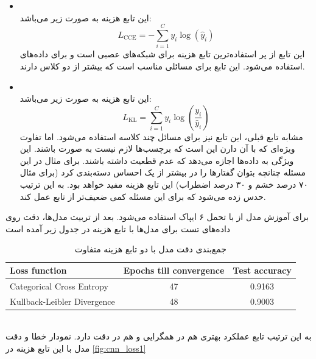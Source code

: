 \documentclass[11pt]{article}
\begin{document}
	\begin{itemize}
		\item \textbf{}\\
		این تابع هزینه به صورت زیر می‌باشد:
		\begin{equation}
			L_{\text{CCE}} = -\sum_{i=1}^{C} y_i \log(\hat{y}_i)
		\end{equation}
		این تابع از پر استفاده‌ترین تابع هزینه برای شبکه‌های عصبی است و برای داده‌های  استفاده می‌شود. این تابع برای مسائلی مناسب است که بیشتر از دو کلاس دارند. 
		\item \textbf{}\\
		این تابع هزینه به صورت زیر می‌باشد:
		\begin{equation}
			L_{\text{KL}} = \sum_{i=1}^{C} y_i \log\left(\frac{y_i}{\hat{y}_i}\right)
		\end{equation}
		مشابه تابع قبلی،‌ این تابع نیز برای مسائل چند کلاسه استفاده می‌شود. اما تفاوت ویژه‌ای که با آن دارن این است که برچسب‌ها لازم نیست به صورت  باشند. این ویژگی به داده‌ها اجازه می‌دهد که عدم قطعیت داشته باشند. برای مثال در این مسئله چنانچه بتوان گفتار‌ها را در بیشتر از یک احساس دسته‌بندی کرد (برای مثال ۷۰ درصد خشم و ۳۰ درصد اضطراب) این تابع هزینه مفید خواهد بود. به این ترتیب حدس زده می‌شود که برای این مسئله کمی ضعیف‌تر از تابع  عمل کند.
	\end{itemize}
	برای آموزش مدل از  با تحمل ۶ ایپاک استفاده می‌شود. بعد از تربیت مدل‌ها، دقت روی داده‌های تست برای مدل‌ها با تابع هزینه در جدول زیر آمده است
	\begin{table}[h!]
		\caption{جمع‌بندی دقت مدل‌  با دو تابع هزینه متفاوت}
		\begin{latin}
			\centering
			\begin{tabular}{|l|c|c|}
				\hline
				\textbf{Loss function} &  \textbf{Epochs till convergence} & \textbf{Test accuracy} \\ \hline
				Categorical Cross Entropy &  47 & 0.9163 \\  \hline
				Kullback-Leibler Divergence &  48 & 0.9003\\ \hline
			\end{tabular}
		\end{latin}
		\label{tab:accuracy_cnn} 
	\end{table}\\
	به این ترتیب تابع  عملکرد بهتری هم در همگرایی و هم در دقت دارد. نمودار خطا و دقت مدل با این تابع هزینه در 
	\autoref{fig:cnn_loss1}
\end{document}

